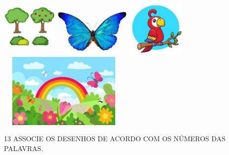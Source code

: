 \includegraphics[width=1.08333in,height=1.19792in]{media/image110.jpg}
\includegraphics[width=1.47778in,height=0.91667in]{media/image111.jpg}
\includegraphics[width=1.11458in,height=1.08403in]{media/image112.jpg}
\includegraphics[width=2.53125in,height=1.44792in]{media/image113.jpg}

\pagebreak
\num{13} ASSOCIE OS DESENHOS DE ACORDO COM OS NÚMEROS DAS PALAVRAS.

